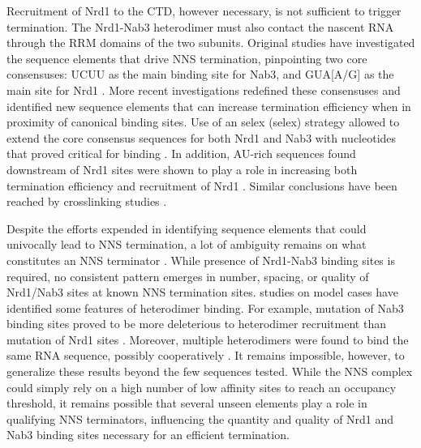 Recruitment of Nrd1 to the CTD, however necessary, is not sufficient to trigger termination. 
The Nrd1-Nab3 heterodimer must also contact the nascent RNA through the RRM domains of the two subunits.
Original studies have investigated the sequence elements that drive NNS termination, pinpointing two core consensuses: UCUU as the main binding site for Nab3, and GUA[A/G] as the main site for Nrd1 \cite{carroll:2004:identification}. 
More recent investigations redefined these consensuses and identified new sequence elements that can increase termination efficiency when in proximity of canonical binding sites. 
Use of an \invivo{} \gls{selex} (\glsdesc{selex}) strategy allowed to extend the core consensus sequences for both Nrd1 and Nab3 with nucleotides that proved critical for binding \cite{porrua:2012:in}. 
In addition, AU-rich sequences found downstream of Nrd1 sites were shown to play a role in increasing both termination efficiency and recruitment of Nrd1 \cite{porrua:2012:in}. Similar conclusions have been reached by \invivo{} crosslinking studies \cite{wlotzka:2011:nuclear}.

Despite the efforts expended in identifying sequence elements that could univocally lead to NNS termination, a lot of ambiguity remains on what constitutes an NNS terminator \invivo{}. 
While presence of Nrd1-Nab3 binding sites is required, no consistent pattern emerges in number, spacing, or quality of Nrd1/Nab3 sites at known NNS termination sites. 
\Invitro{} studies on model cases have identified some features of heterodimer binding. 
For example, mutation of Nab3 binding sites proved to be more deleterious to heterodimer recruitment than mutation of Nrd1 sites \cite{carroll:2007:interaction}. 
Moreover, multiple heterodimers were found to bind the same RNA sequence, possibly cooperatively  \cite{carroll:2007:interaction}. 
It remains impossible, however, to generalize these results beyond the few sequences tested. 
While the NNS complex could simply rely on a high number of low affinity sites to reach an occupancy threshold, it remains possible that several unseen elements play a role in qualifying NNS terminators, influencing the quantity and quality of Nrd1 and Nab3 binding sites necessary for an efficient termination.

